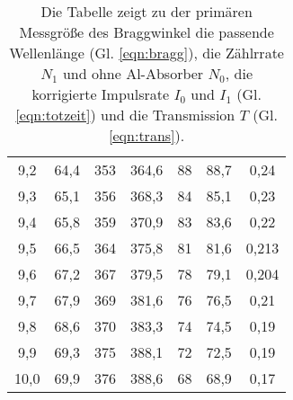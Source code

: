 \begin{table}[H]
\begin{tabular}{c | c | c | c | c | c | c}
        9,2 & 64,4 & 353 & 364,6 & 88 & 88,7 & 0,24\\
        9,3 & 65,1 & 356 & 368,3 & 84 & 85,1& 0,23\\
        9,4 & 65,8 & 359 & 370,9 & 83 & 83,6 & 0,22\\
        9,5 & 66,5 & 364 & 375,8 & 81 & 81,6 & 0,213\\
        9,6 & 67,2 & 367 & 379,5 & 78 & 79,1 & 0,204\\
        9,7 & 67,9 & 369 & 381,6 & 76 & 76,5 & 0,21\\
        9,8 & 68,6 & 370 & 383,3 & 74 & 74,5 & 0,19\\
        9,9 & 69,3 & 375 & 388,1 & 72 & 72,5 & 0,19\\
        10,0 & 69,9 & 376 & 388,6 & 68 & 68,9 & 0,17\\
    \bottomrule 
    \end{tabular}
    \caption{Die Tabelle zeigt zu der primären Messgröße des Braggwinkel die passende Wellenlänge
    (Gl. \ref{eqn:bragg}), die Zählrrate $N_1$ und ohne Al-Absorber $N_0$, die korrigierte
    Impulsrate $I_0$ und $I_1$ (Gl. \ref{eqn:totzeit}) und die Transmission $T$ (Gl. \ref{eqn:trans}). }
\end{table}

\label{sec:anhang}

